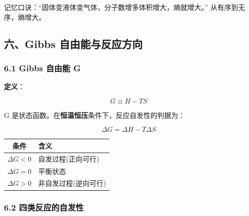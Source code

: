 记忆口诀：``固体变液体变气体，分子数增多体积增大，熵就增大。'' 从有序到无序，熵增大。

\subsection{六、Gibbs 自由能与反应方向}\label{ux516dgibbs-ux81eaux7531ux80fdux4e0eux53cdux5e94ux65b9ux5411}

\subsubsection{6.1 Gibbs 自由能 G}\label{gibbs-ux81eaux7531ux80fd-g}

\textbf{定义}：

\[
G \equiv H - TS
\]

G 是状态函数。在\textbf{恒温恒压}条件下，反应自发性的判据为：

\[
\boxed{\Delta G = \Delta H - T\Delta S}
\]

{\def\LTcaptype{none} %
\begin{longtable}[]{@{}cl@{}}
\toprule\noalign{}
条件 & 含义 \\
\midrule\noalign{}
\endhead
\bottomrule\noalign{}
\endlastfoot
\(\Delta G < 0\) & 自发过程(正向可行) \\
\(\Delta G = 0\) & 平衡状态 \\
\(\Delta G > 0\) & 非自发过程(逆向可行) \\
\end{longtable}
}

\subsubsection{6.2 四类反应的自发性}\label{ux56dbux7c7bux53cdux5e94ux7684ux81eaux53d1ux6027}

